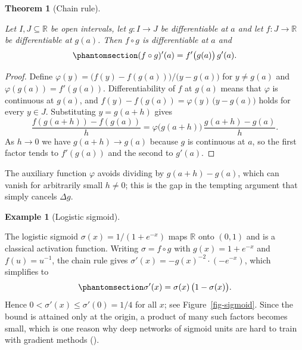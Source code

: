 \documentclass[
  english,
  11pt,
  a4paper,
  twoside,
  open=any,
  numbers=noenddot]{scrbook}
\theoremstyle{plain}
\newtheorem{theorem}{Theorem}[chapter]
\theoremstyle{plain}
\theoremstyle{plain}
\theoremstyle{definition}
\theoremstyle{definition}
\theoremstyle{definition}
\newtheorem{example}{Example}[chapter]
\theoremstyle{remark}
\begin{document}
\begin{theorem}[Chain
rule]\protect\hypertarget{thm-chain-rule}{}\label{thm-chain-rule}

Let \(I, J \subseteq \mathbb{R}\) be open intervals, let
\(g\colon I \to J\) be differentiable at \(a\) and let
\(f\colon J \to \mathbb{R}\) be differentiable at \(g(a)\). Then
\(f \circ g\) is differentiable at \(a\) and
\begin{equation}\protect\phantomsection\label{eq-chain-rule}{
(f\circ g)'(a) = f'\big(g(a)\big)\, g'(a).
}\end{equation}

\end{theorem}

\begin{proof}
Define \(\varphi(y) = \big(f(y) - f(g(a))\big)/\big(y - g(a)\big)\) for
\(y \neq g(a)\) and \(\varphi(g(a)) = f'(g(a))\). Differentiability of
\(f\) at \(g(a)\) means that \(\varphi\) is continuous at \(g(a)\), and
\(f(y) - f(g(a)) = \varphi(y)\,\big(y - g(a)\big)\) holds for every
\(y \in J\). Substituting \(y = g(a+h)\) gives \[
\frac{f(g(a+h)) - f(g(a))}{h} = \varphi\big(g(a+h)\big)\,\frac{g(a+h) - g(a)}{h}.
\] As \(h \to 0\) we have \(g(a+h) \to g(a)\) because \(g\) is
continuous at \(a\), so the first factor tends to \(f'(g(a))\) and the
second to \(g'(a)\).
\end{proof}

The auxiliary function \(\varphi\) avoids dividing by \(g(a+h) - g(a)\),
which can vanish for arbitrarily small \(h \neq 0\); this is the gap in
the tempting argument that simply cancels \(\Delta g\).

\begin{example}[Logistic
sigmoid]\protect\hypertarget{exm-sigmoid-derivative}{}\label{exm-sigmoid-derivative}

The logistic sigmoid
\(\sigma(x) = 1/(1 + e^{-x})\) maps \(\mathbb{R}\) onto \((0,1)\) and is
a classical activation function. Writing \(\sigma = f \circ g\) with
\(g(x) = 1 + e^{-x}\) and \(f(u) = u^{-1}\), the chain rule gives
\(\sigma'(x) = -g(x)^{-2}\cdot(-e^{-x})\), which simplifies to
\begin{equation}\protect\phantomsection\label{eq-sigmoid-derivative}{
\sigma'(x) = \sigma(x)\,\big(1 - \sigma(x)\big).
}\end{equation} Hence \(0 < \sigma'(x) \le \sigma'(0) = 1/4\) for all
\(x\); see Figure~\ref{fig-sigmoid}. Since the bound is attained only at
the origin, a product of many such factors becomes small, which is one
reason why deep networks of sigmoid units are hard to train with
gradient methods ().

\end{example}
\end{document}
